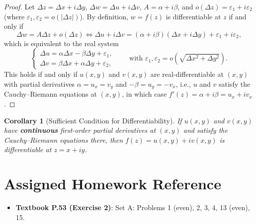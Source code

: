 \documentclass[11pt,a4paper]{article}
\theoremstyle{breakdef}
\theoremstyle{breakthm}
\newtheorem{corollary}{Corollary}
\begin{document}
\begin{proof}
Let $\Delta z = \Delta x + i\Delta y$, $\Delta w = \Delta u + i\Delta v$, $A = \alpha + i\beta$, and $o(\Delta z) = \varepsilon_1 + i\varepsilon_2$ (where $\varepsilon_1, \varepsilon_2 = o(|\Delta z|)$). By definition, $w = f(z)$ is differentiable at $z$ if and only if
\[
    \Delta w = A\Delta z + o(\Delta z) \iff \Delta u + i\Delta v = (\alpha + i\beta)(\Delta x + i\Delta y) + \varepsilon_1 + i\varepsilon_2,
\]
which is equivalent to the real system
\[
    \begin{cases}
        \Delta u = \alpha \Delta x - \beta \Delta y + \varepsilon_1, \\
        \Delta v = \beta \Delta x + \alpha \Delta y + \varepsilon_2,
    \end{cases}
    \qquad \text{with } \varepsilon_1, \varepsilon_2 = o\left(\sqrt{\Delta x^2 + \Delta y^2}\right).
\]
This holds if and only if $u(x, y)$ and $v(x, y)$ are real-differentiable at $(x, y)$ with partial derivatives $\alpha = u_x = v_y$ and $-\beta = u_y = -v_x$, i.e., $u$ and $v$ satisfy the Cauchy--Riemann equations at $(x, y)$, in which case $f'(z) = \alpha + i\beta = u_x + iv_x$.
\end{proof}

\begin{corollary}[Sufficient Condition for Differentiability]
If $u(x, y)$ and $v(x, y)$ have \textbf{continuous} first-order partial derivatives at $(x, y)$ and satisfy the Cauchy--Riemann equations there, then $f(z) = u(x, y) + iv(x, y)$ is differentiable at $z = x + iy$.
\end{corollary}

\section*{Assigned Homework Reference}
\begin{itemize}
    \item \textbf{Textbook P.53 (Exercise 2)}: Set A: Problems 1 (even), 2, 3, 4, 13 (even), 15.
\end{itemize}
\end{document}
